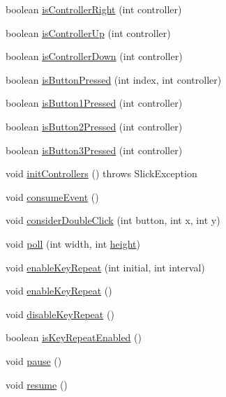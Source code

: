 \begin{DoxyCompactItemize}
\item 
boolean \mbox{\hyperlink{classorg_1_1newdawn_1_1slick_1_1_input_a216e74d174302d5f2656027f0983d53a}{is\+Controller\+Right}} (int controller)
\item 
boolean \mbox{\hyperlink{classorg_1_1newdawn_1_1slick_1_1_input_a222f2a8caf403540d14050698bfc4415}{is\+Controller\+Up}} (int controller)
\item 
boolean \mbox{\hyperlink{classorg_1_1newdawn_1_1slick_1_1_input_aa958c1b868e9398c8e2aeba952a67fd5}{is\+Controller\+Down}} (int controller)
\item 
boolean \mbox{\hyperlink{classorg_1_1newdawn_1_1slick_1_1_input_a82287bcba0cef087bcb8a92f1bcd3d53}{is\+Button\+Pressed}} (int index, int controller)
\item 
boolean \mbox{\hyperlink{classorg_1_1newdawn_1_1slick_1_1_input_af5ec91d4dcd5ab3a675007a6db8ab785}{is\+Button1\+Pressed}} (int controller)
\item 
boolean \mbox{\hyperlink{classorg_1_1newdawn_1_1slick_1_1_input_a5e0bc9417240b65b84bc11db649f4a6a}{is\+Button2\+Pressed}} (int controller)
\item 
boolean \mbox{\hyperlink{classorg_1_1newdawn_1_1slick_1_1_input_a47e301d1be0b31ee4228044f9826a458}{is\+Button3\+Pressed}} (int controller)
\item 
void \mbox{\hyperlink{classorg_1_1newdawn_1_1slick_1_1_input_ab570b66f776cd2148c7ccf026dfd9b08}{init\+Controllers}} ()  throws Slick\+Exception 
\item 
void \mbox{\hyperlink{classorg_1_1newdawn_1_1slick_1_1_input_a03ef6ccfdd2aed8c0d25111b1d310a40}{consume\+Event}} ()
\item 
void \mbox{\hyperlink{classorg_1_1newdawn_1_1slick_1_1_input_a2333c548372f4cf0b26c0aa0c15a2029}{consider\+Double\+Click}} (int button, int x, int y)
\item 
void \mbox{\hyperlink{classorg_1_1newdawn_1_1slick_1_1_input_ab0bd897ff9bebf164e73a42bb560451b}{poll}} (int width, int \mbox{\hyperlink{classorg_1_1newdawn_1_1slick_1_1_input_a7d805ec6ad6944a4c48189e8435c3589}{height}})
\item 
void \mbox{\hyperlink{classorg_1_1newdawn_1_1slick_1_1_input_a949805ba38338134d88e0082d10a29ed}{enable\+Key\+Repeat}} (int initial, int interval)
\item 
void \mbox{\hyperlink{classorg_1_1newdawn_1_1slick_1_1_input_acadc9ec95201bfaf4787205c9033443e}{enable\+Key\+Repeat}} ()
\item 
void \mbox{\hyperlink{classorg_1_1newdawn_1_1slick_1_1_input_ae223c9d3e3cbc220ffb0566f5ea19f2f}{disable\+Key\+Repeat}} ()
\item 
boolean \mbox{\hyperlink{classorg_1_1newdawn_1_1slick_1_1_input_a81051ce61287d26d30ee47a0af2a08eb}{is\+Key\+Repeat\+Enabled}} ()
\item 
void \mbox{\hyperlink{classorg_1_1newdawn_1_1slick_1_1_input_a5fe572bdb06dc3e97999d14637757707}{pause}} ()
\item 
void \mbox{\hyperlink{classorg_1_1newdawn_1_1slick_1_1_input_acd8cba92da1d0f96462343e2853d92b7}{resume}} ()
\end{DoxyCompactItemize}
